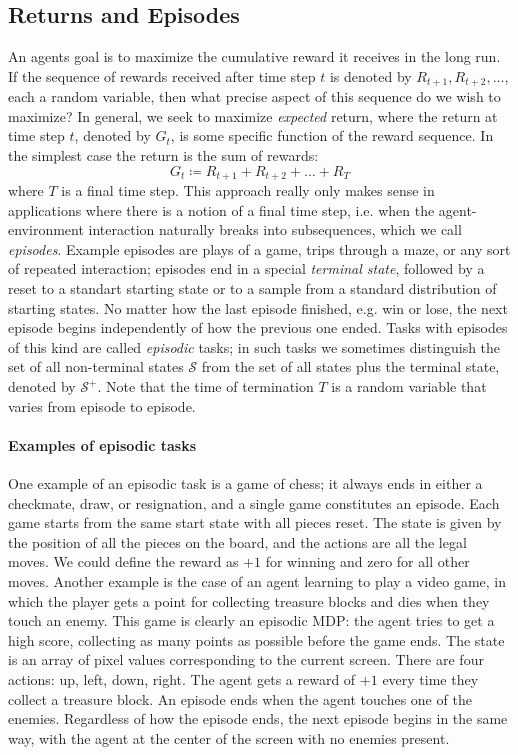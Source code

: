 \documentclass[12pt]{article}
\begin{document}
\subsection{Returns and Episodes} An agents goal is to maximize the cumulative reward it receives in the long run. If the sequence of rewards received after time step $t$ is denoted by $R_{t+1}, R_{t+2}, \ldots$, each a random variable, then what precise aspect of this sequence do we wish to maximize? In general, we seek to maximize \emph{expected} return, where the return at time step $t$, denoted by $G_t$,
is some specific function of the reward sequence. In the simplest case the return is the sum of rewards:
\begin{equation}
  \label{eq: sumofrewards}
  G_t \coloneqq R_{t+1} + R_{t+2} + \ldots + R_T
\end{equation}
where $T$ is a final time step. This approach really only makes sense in applications where there is a notion of a final time step, i.e. when the agent-environment interaction naturally breaks into subsequences, which we call \emph{episodes}. Example episodes are plays of a game, trips through a maze, or any sort of repeated interaction; episodes end in a special \emph{terminal state}, followed by a reset to a standart starting state or to a sample from a standard distribution of starting states. No matter how the last episode finished, e.g. win or lose, the next episode begins independently of how the previous one ended.  Tasks with episodes of this kind are called \emph{episodic} tasks; in such tasks we sometimes distinguish the set of all non-terminal states $\mathcal S$ from the set of all states plus the terminal state, denoted by $\mathcal S^+$. Note that the time of termination $T$ is a random variable that varies from episode to episode.

\paragraph{Examples of episodic tasks}
One example of an episodic task is a game of chess; it always ends in either a checkmate, draw, or resignation, and a single game constitutes an episode. Each game starts from the same start state with all pieces reset. The state is given by the position of all the pieces on the board, and the actions are all the legal moves. We could define the reward as $+1$ for winning and zero for all other moves. Another example is the case of an agent learning to play a video game, in which the player gets a point for collecting treasure blocks and dies when they touch an enemy. This game is clearly an episodic MDP: the agent tries to get a high score, collecting as many points as possible before the game ends. The state is an array of pixel values corresponding to the current screen. There are four actions: up, left, down, right. The agent gets a reward of $+1$ every time they collect a treasure block. An episode ends when the agent touches one of the enemies. Regardless of how the episode ends, the next episode begins in the same way, with the agent at the center of the screen with no enemies present.
\end{document}
